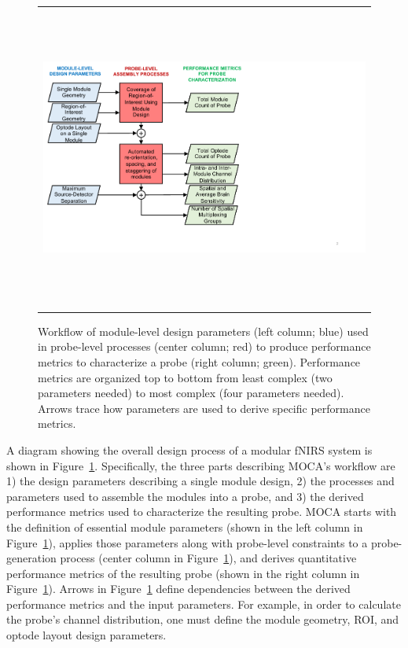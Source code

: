 \begin{figure}
    \begin{center}
    \begin{tabular}{c}
    \includegraphics[height=10cm]{fig/moca/Fig_1.pdf}
    \end{tabular}
    \end{center}
    \caption { \label{fig:flowchart} Workflow of module-level design parameters (left column; blue) used in probe-level processes (center column; red) to produce performance metrics to characterize a probe (right column; green). Performance metrics are organized top to bottom from least complex (two parameters needed) to most complex (four parameters needed). Arrows trace how parameters are used to derive specific performance metrics.} 
\end{figure} 

A diagram showing the overall design process of a modular \ac{fNIRS} system is shown in Figure~\ref{fig:flowchart}. Specifically, the three parts describing \ac{MOCA}'s workflow are 1) the design parameters describing a single module design, 2) the processes and parameters used to assemble the modules into a probe, and 3) the derived performance metrics used to characterize the resulting probe. \ac{MOCA} starts with the definition of essential module parameters (shown in the left column in Figure~\ref{fig:flowchart}), applies those parameters along with probe-level constraints to a probe-generation process (center column in Figure~\ref{fig:flowchart}), and derives quantitative performance metrics of the resulting probe (shown in the right column in Figure~\ref{fig:flowchart}). Arrows in Figure~\ref{fig:flowchart} define dependencies between the derived performance metrics and the input parameters. For example, in order to calculate the probe's channel distribution, one must define the module geometry, \ac{ROI}, and optode layout design parameters. 

